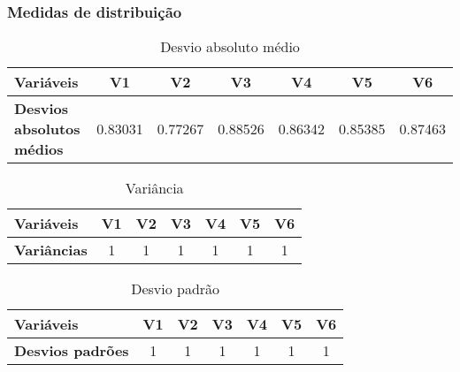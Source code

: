 \begin{frame}[shrink=30]
    \frametitle{Medidas de distribuição}
    \vspace{3em}
    \begin{table}
        \begin{tabular}{ l | c | c | c | c | c | c }
            \textbf{Variáveis} & V1 & V2 & V3 & V4 & V5 & V6 \\ \hline \hline 
            \textbf{Desvios absolutos médios}      & 0.83031     & 0.77267     & 0.88526     & 0.86342     & 0.85385     & 0.87463 \\  
        \end{tabular}
        \caption{Desvio absoluto médio}
    \end{table}

    \begin{table}
        \begin{tabular}{ l | c | c | c | c | c | c }
            \textbf{Variáveis} & V1 & V2 & V3 & V4 & V5 & V6 \\ \hline \hline 
            \textbf{Variâncias}  & 1 & 1 & 1 & 1 & 1 & 1 \\  
        \end{tabular}
        \caption{Variância}
    \end{table}

    \begin{table}
        \begin{tabular}{ l | c | c | c | c | c | c }
            \textbf{Variáveis} & V1 & V2 & V3 & V4 & V5 & V6 \\ \hline \hline 
            \textbf{Desvios padrões}  & 1 & 1 & 1 & 1 & 1 & 1 \\  
        \end{tabular}
        \caption{Desvio padrão}
    \end{table}

\end{frame}

